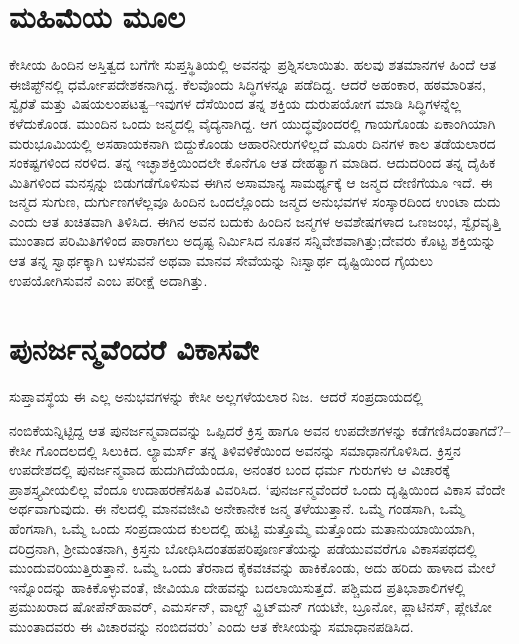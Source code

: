 \section*{ಮಹಿಮೆಯ ಮೂಲ}


ಕೇಸೀಯ ಹಿಂದಿನ ಅಸ್ತಿತ್ವದ ಬಗೆಗೇ ಸುಪ್ತಸ್ಥಿತಿಯಲ್ಲಿ ಅವನನ್ನು ಪ್ರಶ್ನಿಸಲಾಯಿತು. ಹಲವು ಶತಮಾನಗಳ ಹಿಂದೆ ಆತ ಈಜಿಪ್ಟ್​ನಲ್ಲಿ ಧರ್ಮೋಪದೇಶಕನಾಗಿದ್ದ. ಕೆಲವೊಂದು ಸಿದ್ಧಿಗಳನ್ನೂ ಪಡೆದಿದ್ದ. ಆದರೆ ಅಹಂಕಾರ, ಹಠಮಾರಿತನ, ಸ್ವೈರತೆ ಮತ್ತು ವಿಷಯಲಂಪಟತ್ವ–ಇವುಗಳ ದೆಸೆಯಿಂದ ತನ್ನ ಶಕ್ತಿಯ ದುರುಪಯೋಗ ಮಾಡಿ ಸಿದ್ಧಿಗಳನ್ನೆಲ್ಲ ಕಳೆದುಕೊಂಡ. ಮುಂದಿನ ಒಂದು ಜನ್ಮದಲ್ಲಿ ವೈದ್ಯನಾಗಿದ್ದ. ಆಗ ಯುದ್ಧವೊಂದರಲ್ಲಿ ಗಾಯಗೊಂಡು ಏಕಾಂಗಿಯಾಗಿ ಮರುಭೂಮಿಯಲ್ಲಿ ಅಸಹಾಯಕನಾಗಿ ಬಿದ್ದುಕೊಂಡು ಆಹಾರನೀರುಗಳಿಲ್ಲದೆ ಮೂರು ದಿನಗಳ ಕಾಲ ತಡೆಯಲಾರದ ಸಂಕಷ್ಟಗಳಿಂದ ನರಳಿದ. ತನ್ನ ಇಚ್ಛಾಶಕ್ತಿಯಿಂದಲೇ ಕೊನೆಗೂ ಆತ ದೇಹತ್ಯಾಗ ಮಾಡಿದ. ಆದುದರಿಂದ ತನ್ನ ದೈಹಿಕ ಮಿತಿಗಳಿಂದ ಮನಸ್ಸನ್ನು ಬಿಡುಗಡೆಗೊಳಿಸುವ ಈಗಿನ ಅಸಾಮಾನ್ಯ ಸಾಮರ್ಥ್ಯಕ್ಕೆ ಆ ಜನ್ಮದ ದೇಣಿಗೆಯೂ ಇದೆ. ಈ ಜನ್ಮದ ಸುಗುಣ, ದುರ್ಗುಣಗಳೆಲ್ಲವೂ ಹಿಂದಿನ ಒಂದಲ್ಲೊಂದು ಜನ್ಮದ ಅನುಭವಗಳ ಸಂಸ್ಕಾರದಿಂದ ಉಂಟಾ ದುದು ಎಂದು ಆತ ಖಚಿತವಾಗಿ ತಿಳಿಸಿದ. ಈಗಿನ ಅವನ ಬದುಕು ಹಿಂದಿನ ಜನ್ಮಗಳ ಅವಶೇಷಗಳಾದ ಒಣಜಂಭ, ಸ್ವೈರವೃತ್ತಿ ಮುಂತಾದ ಪರಿಮಿತಿಗಳಿಂದ ಪಾರಾಗಲು ಅದೃಷ್ಟ ನಿರ್ಮಿಸಿದ ನೂತನ ಸನ್ನಿವೇಶವಾಗಿತ್ತು;\break ದೇವರು ಕೊಟ್ಟ ಶಕ್ತಿಯನ್ನು ಆತ ತನ್ನ ಸ್ವಾರ್ಥಕ್ಕಾಗಿ ಬಳಸುವನೆ ಅಥವಾ ಮಾನವ ಸೇವೆಯನ್ನು ನಿಃಸ್ವಾರ್ಥ ದೃಷ್ಟಿಯಿಂದ ಗೈಯಲು ಉಪಯೋಗಿಸುವನೆ ಎಂಬ ಪರೀಕ್ಷೆ ಅದಾಗಿತ್ತು.


\section*{ಪುನರ್ಜನ್ಮವೆಂದರೆ ವಿಕಾಸವೇ}


{\parfillskip=0pt ಸುಪ್ತಾವಸ್ಥೆಯ ಈ ಎಲ್ಲ ಅನುಭವಗಳನ್ನು ಕೇಸೀ ಅಲ್ಲಗಳೆಯಲಾರ ನಿಜ.\ ಆದರೆ ಸಂಪ್ರದಾಯದಲ್ಲಿ\par}\newpage\noindent ನಂಬಿಕೆಯನ್ನಿಟ್ಟಿದ್ದ ಆತ ಪುನರ್ಜನ್ಮವಾದವನ್ನು ಒಪ್ಪಿದರೆ ಕ್ರಿಸ್ತ ಹಾಗೂ ಅವನ ಉಪದೇಶಗಳನ್ನು ಕಡೆಗಣಿಸಿದಂತಾಗದೆ?–ಕೇಸೀ ಗೊಂದಲದಲ್ಲಿ ಸಿಲುಕಿದ. ಲ್ಯಾಮರ್ಸ್ ತನ್ನ ತಿಳಿವಳಿಕೆಯಿಂದ ಅವನನ್ನು ಸಮಾಧಾನಗೊಳಿಸಿದ. ಕ್ರಿಸ್ತನ ಉಪದೇಶದಲ್ಲಿ ಪುನರ್ಜನ್ಮವಾದ ಹುದುಗಿದೆಯೆಂದೂ, ಅನಂತರ ಬಂದ ಧರ್ಮ ಗುರುಗಳು ಆ ವಿಚಾರಕ್ಕೆ ಪ್ರಾಶಸ್ತ್ಯವೀಯಲಿಲ್ಲ ವೆಂದೂ ಉದಾಹರಣೆ\-ಸಹಿತ ವಿವರಿಸಿದ. ‘ಪುನರ್ಜನ್ಮವೆಂದರೆ ಒಂದು ದೃಷ್ಟಿಯಿಂದ ವಿಕಾಸ ವೆಂದೇ ಅರ್ಥವಾಗುವುದು. ಈ ನೆಲದಲ್ಲಿ ಮಾನವಜೀವಿ ಅನೇಕಾನೇಕ ಜನ್ಮ ತಳೆಯುತ್ತಾನೆ. ಒಮ್ಮೆ ಗಂಡಸಾಗಿ, ಒಮ್ಮೆ ಹೆಂಗಸಾಗಿ, ಒಮ್ಮೆ ಒಂದು ಸಂಪ್ರದಾಯದ ಕುಲದಲ್ಲಿ ಹುಟ್ಟಿ ಮತ್ತೊಮ್ಮೆ ಮತ್ತೊಂದು ಮತಾನುಯಾಯಿಯಾಗಿ, ದರಿದ್ರನಾಗಿ, ಶ‍್ರೀಮಂತನಾಗಿ, ಕ್ರಿಸ್ತನು ಬೋಧಿಸಿದಂತಹ\break ಪರಿಪೂರ್ಣತೆಯನ್ನು ಪಡೆಯುವವರೆಗೂ ವಿಕಾಸಪಥದಲ್ಲಿ ಮುಂದುವರಿಯುತ್ತಿರುತ್ತಾನೆ. ಒಮ್ಮೆ ಒಂದು ತೆರನಾದ ಕೈಕವಚವನ್ನು ಹಾಕಿಕೊಂಡು, ಅದು ಹರಿದು ಹಾಳಾದ ಮೇಲೆ ಇನ್ನೊಂದನ್ನು ಹಾಕಿಕೊಳ್ಳುವಂತೆ, ಜೀವಿಯೂ ದೇಹವನ್ನು ಬದಲಾಯಿಸುತ್ತದೆ. ಪಶ್ಚಿಮದ ಪ್ರತಿಭಾಶಾಲಿಗಳಲ್ಲಿ ಪ್ರಮುಖರಾದ ಷೋಪೆನ್​ಹಾವರ್, ಎಮರ್ಸನ್, ವಾಲ್ಟ್ ವ್ಹಿಟ್​ಮನ್ ಗಯಟೇ, ಬ್ರೂನೋ, ಪ್ಲಾಟಿನಸ್, ಪ್ಲೇಟೋ ಮುಂತಾದವರು ಈ ವಿಚಾರವನ್ನು ನಂಬಿದವರು’ ಎಂದು ಆತ ಕೇಸೀಯನ್ನು ಸಮಾಧಾನಪಡಿಸಿದ.


